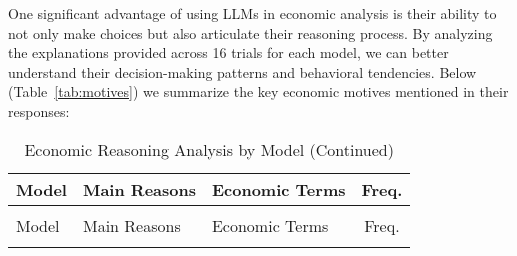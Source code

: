 \documentclass[12pt]{article}
\begin{document}
\begin{CJK*}{UTF8}{gbsn}
One significant advantage of using LLMs in economic analysis is their ability to not only make choices but also articulate their reasoning process. By analyzing the explanations provided across 16 trials for each model, we can better understand their decision-making patterns and behavioral tendencies. Below (Table~\ref{tab:motives}) we summarize the key economic motives mentioned in their responses:
\captionsetup{width=.95\textwidth}
\begin{longtable}{p{2cm}p{6cm}p{4cm}c}
\caption{Qualitative Analysis of Economic Decision-Making} \\
\hline
Model & Main Reasons & Economic Terms & Freq. \\
\hline
\endfirsthead
\caption{Economic Reasoning Analysis by Model (Continued)} \\
\hline
Model & Main Reasons & Economic Terms & Freq. \\
\hline
\endhead
\hline
\endfoot


\end{longtable}
\end{CJK*}
\end{document}
